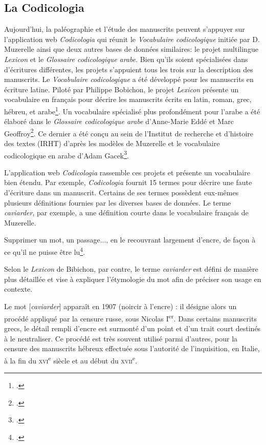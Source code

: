 \documentclass[class=article, crop=false]{standalone}
\begin{document}
\subsection{La Codicologia}

Aujourd'hui, la paléographie et l'étude des manuscrits peuvent s'appuyer sur l'application web \textit{Codicologia} qui réunit le \textit{Vocabulaire codicologique} initiée par D. Muzerelle ainsi que deux autres bases de données similaires: le projet multilingue \textit{Lexicon} et le \textit{Glossaire codicologique arabe}. Bien qu'ils soient spécialisées dans d'écritures différentes, les projets s'appuient tous les trois sur la description des manuscrits. Le \textit{Vocabulaire codicologique} a été développé pour les manuscrits en écriture latine. Piloté par Philippe Bobichon, le projet \textit{Lexicon} présente un vocabulaire en français pour décrire les manuscrits écrits en latin, roman, grec, hébreu, et arabe\footcite{bobichonLexiconMisePage2009}. Un vocabulaire spécialisé plus profondément pour l'arabe a été élaboré dans le \textit{Glossaire codicologique arabe} d'Anne-Marie Eddé et Marc Geoffroy\footcite{GlossaireCodicologiqueFrancaisarabe2002}. Ce dernier a été conçu au sein de l'Institut de recherche et d'histoire des textes (IRHT) d'après les modèles de Muzerelle et le vocabulaire codicologique en arabe d'Adam Gacek\footcite{gacekArabicManuscriptTradition2001}.

L'application web \textit{Codicologia} rassemble ces projets et présente un vocabulaire bien étendu. Par exemple, \textit{Codicologia} fournit 15 termes pour décrire une faute d'écriture dans un manuscrit. Certains de ses termes possèdent eux-mêmes plusieurs définitions fournies par les diverses bases de données. Le terme \textit{caviarder}, par exemple, a une définition courte dans le vocabulaire français de Muzerelle. 

\begin{displayquote}
Supprimer un mot, un passage..., en le recouvrant largement d'encre, de façon à ce qu'il ne puisse être lu\footcite{muzerelleCaviarder2011}.
\end{displayquote}

\noindent Selon le \textit{Lexicon} de Bibichon, par contre, le terme \textit{caviarder} est défini de manière plus détaillée et vise à expliquer l'étymologie du mot afin de préciser son usage en contexte.

\begin{displayquote}
Le mot [\textit{caviarder}] apparaît en 1907 (noircir à l'encre) : il désigne alors un procédé appliqué par la censure russe, sous Nicolas I\textsuperscript{er}. Dans certains manuscrits grecs, le détail rempli d'encre est surmonté d'un point et d'un trait court destinés à le neutraliser. Ce procédé est très souvent utilisé parmi d'autres, pour la censure des manuscrits hébreux effectuée sous l'autorité de l'inquisition, en Italie, à la fin du \textsc{xvi}\textsuperscript{e} siècle et au début du \textsc{xvii}\textsuperscript{e}\autocite{bobichonCaviarder2011}.


\end{displayquote}
\end{document}
